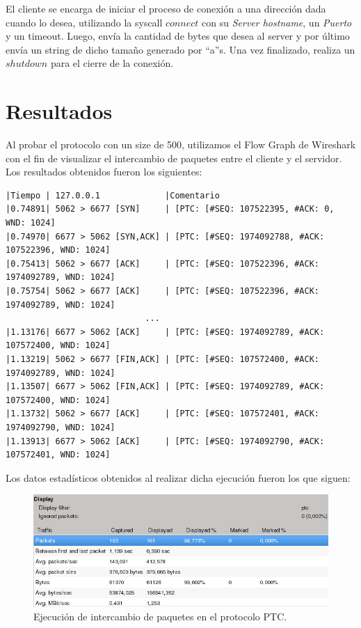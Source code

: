 \documentclass[10pt, a4paper]{article}
\begin{document}
El cliente se encarga de iniciar el proceso de conexión a una dirección dada cuando lo desea, utilizando la syscall $connect$ con su \textit{Server hostname}, un \textit{Puerto} y un timeout. Luego, envía la cantidad de bytes que desea al server y por último envía un string de dicho tamaño generado por ``a''s. Una vez finalizado, realiza un $shutdown$ para el cierre de la conexión.

\section{Resultados}

Al probar el protocolo con un size de 500, utilizamos el Flow Graph de Wireshark con el fin de visualizar el intercambio de paquetes entre el cliente y el servidor. Los resultados obtenidos fueron los siguientes:

\begin{verbatim}
|Tiempo | 127.0.0.1             |Comentario
|0.74891| 5062 > 6677 [SYN]     | [PTC: [#SEQ: 107522395, #ACK: 0, WND: 1024]
|0.74970| 6677 > 5062 [SYN,ACK] | [PTC: [#SEQ: 1974092788, #ACK: 107522396, WND: 1024]
|0.75413| 5062 > 6677 [ACK]     | [PTC: [#SEQ: 107522396, #ACK: 1974092789, WND: 1024]
|0.75754| 5062 > 6677 [ACK]     | [PTC: [#SEQ: 107522396, #ACK: 1974092789, WND: 1024]	
							...
|1.13176| 6677 > 5062 [ACK]     | [PTC: [#SEQ: 1974092789, #ACK: 107572400, WND: 1024]
|1.13219| 5062 > 6677 [FIN,ACK]	| [PTC: [#SEQ: 107572400, #ACK: 1974092789, WND: 1024]
|1.13507| 6677 > 5062 [FIN,ACK]	| [PTC: [#SEQ: 1974092789, #ACK: 107572400, WND: 1024]					
|1.13732| 5062 > 6677 [ACK]     | [PTC: [#SEQ: 107572401, #ACK: 1974092790, WND: 1024]
|1.13913| 6677 > 5062 [ACK]     | [PTC: [#SEQ: 1974092790, #ACK: 107572401, WND: 1024]
\end{verbatim}

Los datos estadísticos obtenidos al realizar dicha ejecución fueron los que siguen:

\begin{figure}[H]
\begin{center}
\includegraphics[width=16cm]{wireshark.png}
\caption{Ejecución de intercambio de paquetes en el protocolo PTC.}
\end{center}
\end{figure}
\end{document}

